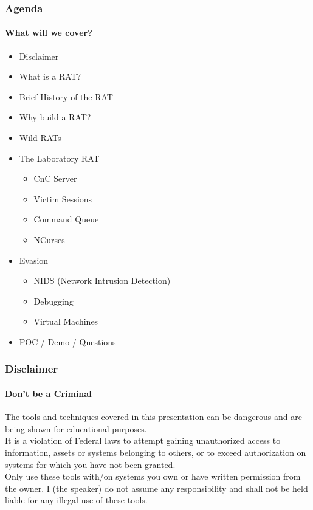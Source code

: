 \documentclass[aspectratio=169]{beamer}
\begin{document}
\begin{frame}
  \frametitle{Agenda}
  \framesubtitle{What will we cover?}
  \begin{itemize}
  \item{Disclaimer}
  \item{What is a RAT?}
  \item{Brief History of the RAT}
  \item{Why build a RAT?}
  \item{Wild RATs}
  \item{The Laboratory RAT}
    \begin{itemize}
    \item{CnC Server}
    \item{Victim Sessions}
    \item{Command Queue}
    \item{NCurses}
    \end{itemize}
  \item{Evasion}
    \begin{itemize}
    \item{NIDS (Network Intrusion Detection)}
    \item{Debugging}
    \item{Virtual Machines}
    \end{itemize}
  \item{POC / Demo / Questions}
  \end{itemize}
\end{frame}

\begin{frame}
  \frametitle{Disclaimer}
  \framesubtitle{Don't be a Criminal}
  \begin{tcolorbox}[title=disclaimer.log,colback=gray]
    The tools and techniques covered in this presentation can be dangerous and are\\
    being shown for educational purposes.\\
    \newline
    It is a violation of Federal laws to attempt gaining unauthorized access to information, assets or systems belonging to others, or to exceed authorization on systems for which you have not been granted.\\
    \newline
    Only use these tools with/on systems you own or have written permission from the owner. I (the speaker) do not assume any responsibility and shall not be held liable for any illegal use of these tools.\\
  \end{tcolorbox}
\end{frame}
\end{document}
